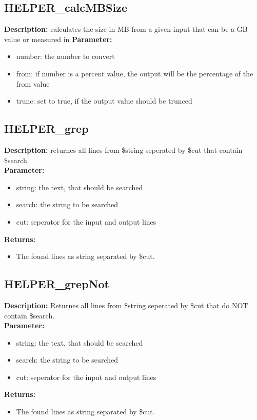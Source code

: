 \subsection{HELPER\_calcMBSize}
\textbf{Description:} calculates the size in MB from a given input that can be a GB value or measured in %
\textbf{Parameter:}
\begin{itemize}
\item number: the number to convert
\item from: if number is a percent value, the output will be the percentage of the from value
\item trunc: set to true, if the output value should be trunced
\end{itemize}

\subsection{HELPER\_grep}
\textbf{Description:} returnes all lines from \$string seperated by \$cut that contain \$search\\
\textbf{Parameter:}
\begin{itemize}
\item string: the text, that should be searched
\item search: the string to be searched
\item cut: seperator for the input and output lines
\end{itemize}
\textbf{Returns:}
\begin{itemize}
\item The found lines as string separated by \$cut.
\end{itemize}

\subsection{HELPER\_grepNot}
\textbf{Description:} Returnes all lines from \$string seperated by \$cut that do NOT contain \$search.\\
\textbf{Parameter:}
\begin{itemize}
\item string: the text, that should be searched
\item search: the string to be searched
\item cut: seperator for the input and output lines
\end{itemize}
\textbf{Returns:}
\begin{itemize}
\item The found lines as string separated by \$cut.
\end{itemize}

